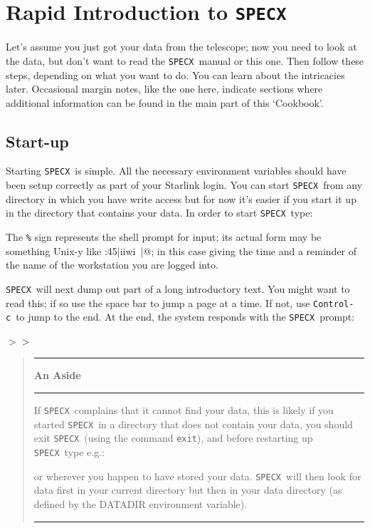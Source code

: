 \documentclass[11pt,twoside]{starlink}
\providecommand{\SPECX}{\texttt{SPECX}}
\providecommand{\margnote}[1]
{\marginpar{({\it{\ref{#1}}})}}
\providecommand{\SP}{{$>\!>$}}
\newenvironment{aside}{
\begin{quote}\begin{center}\rule[1mm]{1.0in}{0.015in}\hspace*{2mm}
\textbf{An Aside}
\hspace*{2mm}\rule[1mm]{1.0in}{0.015in}\end{center}
}{
\myline
\end{quote}
}
\providecommand{\myline}
{\vspace*{-0.2in}\begin{center}\rule{3.0in}{0.015in}\end{center}}
\providecommand{\ctrlc}{\texttt{Control-c}}
\begin{document}
\section{Rapid Introduction to \SPECX }
\label{sec:rapid-specx}
Let's assume you just got your data from the telescope;
now you need to
look at the data, but don't want to read the \SPECX\ manual or this
one. Then follow these steps, depending on what you want to do. You
can learn about the intricacies later. Occasional margin notes, like
the one here\margnote{sec:specx-intro}, indicate sections where
additional information can be found in the main part of this
`Cookbook'.

\subsection{Start-up}
\label{sec:start-up}
\margnote{sec:finding-the-data}

Starting \SPECX\ is simple. All the necessary environment variables should
have been setup correctly as part of your Starlink login.
You can start \SPECX\ from any directory in which you have write access but
for now it's easier if you start it up in the directory that contains your
data. In order to start \SPECX\, type:

\begin{terminalv}
\end{terminalv}
\reversemarginpar
The \texttt{\%} sign represents the shell prompt for input; its actual
form may be something Unix-y like :45|iiwi~|@; in this case
giving the time and a reminder of the name of the workstation you are
logged into.

\SPECX\ will next dump out part of a long introductory
text. You might want to read this; if so use the space bar to jump a
page at a time. If not, use \ctrlc\ to jump to the end. At the end,
the system responds with the \SPECX\ prompt:

\SP

\begin{aside}
If \SPECX\ complains that it cannot find your data, this is likely
if you started \SPECX\ in a directory that does not contain your data,
you
should exit \SPECX\ (using the command {\tt{exit}}), and before
restarting up \SPECX\ type e.g.:

\begin{terminalv}
\end{terminalv}

or wherever you happen to have stored your data. \SPECX\ will then
look for data first in your current directory but then in your data
directory (as defined by the DATADIR environment variable).

\end{aside}
\end{document}
